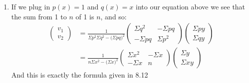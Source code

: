 \documentclass[11pt,a4paper]{article}
\begin{document}
\begin{itemize}
\begin{enumerate} [label={\alph*)}]
\begin{align*}
						A = \begin{pmatrix} \Sigma p^2 & \Sigma pq \\ \Sigma pq & \Sigma q^2 \end{pmatrix}, \quad A^{-1} = \frac{1}{\Sigma p^2\Sigma q^2 - \big(\Sigma pq \big)^2}\begin{pmatrix} 
						\Sigma q^2 & -\Sigma pq \\
						-\Sigma pq & \Sigma p^2
						\end{pmatrix}
					\end{align*}
					we solve for $x = A^{-1}b$:
					$$\begin{pmatrix} v_1 \\ v_2 \end{pmatrix} = \frac{1}{\Sigma p^2\Sigma q^2 - \big(\Sigma pq \big)^2}\begin{pmatrix} 
						\Sigma q^2 & -\Sigma pq \\
						-\Sigma pq & \Sigma p^2
						\end{pmatrix}\begin{pmatrix}
						\Sigma py \\
						\Sigma qy
						\end{pmatrix}$$
						where $p,q,$ and $y$ are $p_i,q_i$ and $y_i$ respectively.
						
						\item If we plug in $p(x)=1$ and $q(x)=x$ into our equation above we see that the sum from 1 to $n$ of 1 is $n$, and so:
						\begin{align*}
							\begin{pmatrix} v_1 \\ v_2 \end{pmatrix} &= \frac{1}{\Sigma p^2\Sigma q^2 - \big(\Sigma pq \big)^2}\begin{pmatrix} 
						\Sigma q^2 & -\Sigma pq \\
						-\Sigma pq & \Sigma p^2
						\end{pmatrix}\begin{pmatrix}
						\Sigma py \\
						\Sigma qy
						\end{pmatrix} \\
						&= \frac{1}{n\Sigma x^2 - \big(\Sigma x \big)^2}\begin{pmatrix} 
						\Sigma x^2 & -\Sigma x \\
						-\Sigma x & n
						\end{pmatrix}\begin{pmatrix}
						\Sigma y \\
						\Sigma xy
						\end{pmatrix}
						\end{align*}
						And this is exactly the formula given in 8.12
						

\end{enumerate}
\end{itemize}
\end{document}
